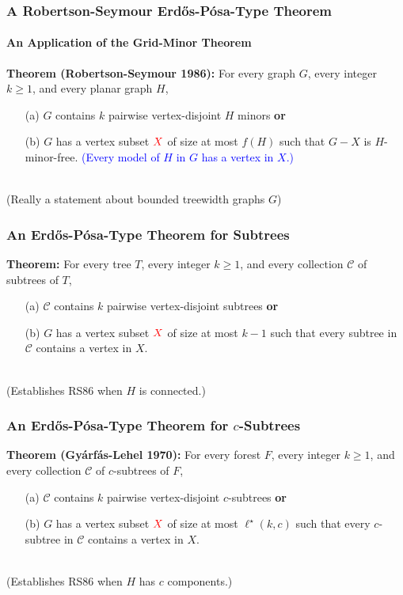\documentclass{beamer}
\begin{document}
\begin{frame}
  \frametitle{A Robertson-Seymour Erdős-Pósa-Type Theorem}
  \framesubtitle{An Application of the Grid-Minor Theorem}

  \noindent\textbf{Theorem (Robertson-Seymour 1986):} For every graph $G$, every integer $k\ge 1$,  and every planar graph $H$,
  \begin{enumerate}%
    \item[(a)] $G$ contains $k$ pairwise vertex-disjoint $H$ minors \textbf{or}
    \item[(b)] $G$ has a vertex subset $\mathcolor{red}{X}$ of size at most $f(H)$ such that $G-X$ is $H$-minor-free. \textcolor{blue}{(Every model of $H$ in $G$ has a vertex in $X$.)}
  \end{enumerate}
  \ \\[3ex]
  (Really a statement about bounded treewidth graphs $G$)
\end{frame}


\begin{frame}
  \frametitle{An Erdős-Pósa-Type Theorem for Subtrees}


  \noindent\textbf{Theorem:} For every tree $T$, every integer $k\ge 1$,  and every collection $\mathcal{C}$ of subtrees of $T$,
  \begin{enumerate}%
    \item[(a)] $\mathcal{C}$ contains $k$ pairwise vertex-disjoint subtrees \textbf{or}
    \item[(b)] $G$ has a vertex subset $\mathcolor{red}{X}$ of size at most $k-1$ such that every subtree in $\mathcal{C}$ contains a vertex in $X$.
  \end{enumerate}
  \ \\[3ex]
  (Establishes RS86 when $H$ is connected.)
\end{frame}


\begin{frame}
  \frametitle{An Erdős-Pósa-Type Theorem for $c$-Subtrees}


  \noindent\textbf{Theorem (Gyárfás-Lehel 1970):} For every forest $F$, every integer $k\ge 1$, and every collection $\mathcal{C}$ of $c$-subtrees of $F$,
  \begin{enumerate}%
    \item[(a)] $\mathcal{C}$ contains $k$ pairwise vertex-disjoint $c$-subtrees \textbf{or}
    \item[(b)] $G$ has a vertex subset $\mathcolor{red}{X}$ of size at most $\ell^\star(k,c)$ such that every $c$-subtree in $\mathcal{C}$ contains a vertex in $X$.
  \end{enumerate}
  \ \\[3ex]
  (Establishes RS86 when $H$ has $c$ components.)
\end{frame}
\end{document}
